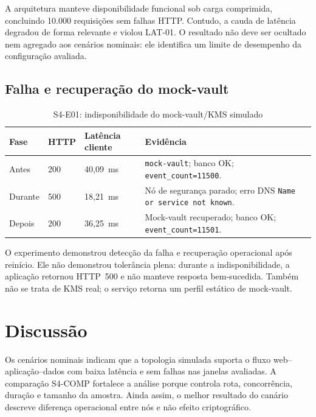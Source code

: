 \documentclass[12pt]{article}
\begin{document}
A arquitetura manteve disponibilidade funcional sob carga comprimida, concluindo 10.000 requisi\c{c}\~oes sem falhas HTTP. Contudo, a cauda de lat\^encia degradou de forma relevante e violou LAT-01. O resultado n\~ao deve ser ocultado nem agregado aos cen\'arios nominais: ele identifica um limite de desempenho da configura\c{c}\~ao avaliada.

\subsection{Falha e recupera\c{c}\~ao do mock-vault}
\begin{table}[ht]
\centering
\caption{S4-E01: indisponibilidade do mock-vault/KMS simulado}
\label{tab:kms-pt}
\small
\begin{tabularx}{\textwidth}{p{}p{}p{}Y}
\toprule
\textbf{Fase} & \textbf{HTTP} & \textbf{Lat\^encia cliente} & \textbf{Evid\^encia} \\
\midrule
Antes & 200 & 40{,}09~ms & \texttt{mock-vault}; banco OK; \texttt{event\_count=11500}. \\
Durante & 500 & 18{,}21~ms & N\'o de seguran\c{c}a parado; erro DNS \texttt{Name or service not known}. \\
Depois & 200 & 36{,}25~ms & Mock-vault recuperado; banco OK; \texttt{event\_count=11501}. \\
\bottomrule
\end{tabularx}
\end{table}

O experimento demonstrou detec\c{c}\~ao da falha e recupera\c{c}\~ao operacional ap\'os rein\'icio. Ele n\~ao demonstrou toler\^ancia plena: durante a indisponibilidade, a aplica\c{c}\~ao retornou HTTP~500 e n\~ao manteve resposta bem-sucedida. Tamb\'em n\~ao se trata de KMS real; o servi\c{c}o retorna um perfil est\'atico de mock-vault.

\section{Discuss\~ao}
Os cen\'arios nominais indicam que a topologia simulada suporta o fluxo web--aplica\c{c}\~ao--dados com baixa lat\^encia e sem falhas nas janelas avaliadas. A compara\c{c}\~ao S4-COMP fortalece a an\'alise porque controla rota, concorr\^encia, dura\c{c}\~ao e tamanho da amostra. Ainda assim, o melhor resultado do can\'ario descreve diferen\c{c}a operacional entre n\'os e n\~ao efeito criptogr\'afico.
\end{document}
